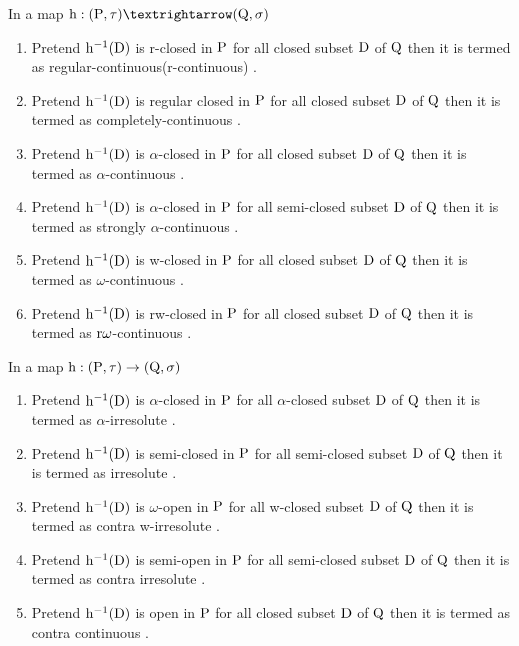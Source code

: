\begin{dfn}\label{dfn1.3.1}
In a map $\TSh: (\TSP, \tau) →(\TSQ, \sigma)$
\begin{enumerate}
\item Pretend $\mathrm{h}^{-1}(\mathrm{D})$ is r-closed in $\mathrm{P}$ for all closed subset $\mathrm{D}$ of $\mathrm{Q}$ then it is termed as regular-continuous(r-continuous) \cite{Arya1}. 
\item Pretend $\mathrm{h}^{-1}(\mathrm{D})$ is regular closed in $\mathrm{P}$ for all closed subset $\mathrm{D}$ of $\mathrm{Q}$ then it is termed as completely-continuous \cite{Levine2}. 
\item Pretend $\mathrm{h}^{-1}(\mathrm{D})$ is $\alpha$-closed in $\mathrm{P}$ for all closed subset $\mathrm{D}$ of $\mathrm{Q}$ then it is termed as $\alpha$-continuous \cite{Maki11}. 
\item Pretend $\mathrm{h}^{-1}(\mathrm{D})$ is $\alpha$-closed in $\mathrm{P}$ for all semi-closed subset $\mathrm{D}$ of $\mathrm{Q}$ then it is termed as strongly $\alpha$-continuous \cite{Maki11}. 
\item Pretend $\mathrm{h}^{-1}(\mathrm{D})$ is w-closed in $\mathrm{P}$ for all closed subset $\mathrm{D}$ of $\mathrm{Q}$ then it is termed as $\omega$-continuous \cite{Sheik}. 
\item Pretend $\mathrm{h}^{-1}(\mathrm{D})$ is rw-closed in $\mathrm{P}$ for all closed subset $\mathrm{D}$ of $\mathrm{Q}$ then it is termed as $\mathrm{r}\omega$-continuous \cite{Benchalli}. 
\end{enumerate}
\end{dfn}

\newpage

\begin{dfn}\label{dfn1.3.2} 
In a map $\mathrm{h}: (\mathrm{P}, \tau) \rightarrow (\mathrm{Q}, \sigma)$
\begin{enumerate}
\item Pretend $\mathrm{h}^{-1}(\mathrm{D})$ is $\alpha$-closed in $\mathrm{P}$ for all $\alpha$-closed subset $\mathrm{D}$ of $\mathrm{Q}$ then it is termed as $\alpha$-irresolute \cite{Maki11}. 
\item Pretend $\mathrm{h}^{-1}(\mathrm{D})$ is semi-closed in $\mathrm{P}$ for all semi-closed subset $\mathrm{D}$ of $\mathrm{Q}$ then it is termed as irresolute \cite{Crossley}.
\item Pretend $\mathrm{h}^{-1}(\mathrm{D})$ is $\omega$-open in $\mathrm{P}$ for all w-closed subset $\mathrm{D}$ of $\mathrm{Q}$ then it is termed as contra w-irresolute \cite{Sheik1}. 
\item Pretend $\mathrm{h}^{-1}(\mathrm{D})$ is semi-open in $\mathrm{P}$ for all semi-closed subset $\mathrm{D}$ of $\mathrm{Q}$ then it is termed as contra irresolute \cite{Baker}. 
\item Pretend $\mathrm{h}^{-1}(\mathrm{D})$ is open in $\mathrm{P}$ for all closed subset $\mathrm{D}$ of $\mathrm{Q}$ then it is termed as contra continuous \cite{Dontchev1}. 
\end{enumerate}
\end{dfn}



